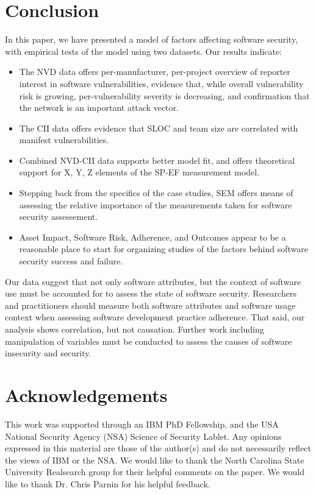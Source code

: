 \section{Conclusion}
\label{sec:conclusion}

In this paper, we have presented a model of factors affecting software security, with empirical tests of the model using two datasets. Our results indicate:
\begin{itemize}
	\item The NVD data offers per-manufacturer, per-project overview of reporter interest in software vulnerabilities, evidence that, while overall vulnerability risk is growing, per-vulnerability severity is decreasing, and confirmation that the network is an important attack vector.
	\item The CII data offers evidence that SLOC and team size are correlated with manifest vulnerabilities. 
	\item Combined NVD-CII data supports better model fit, and offers theoretical support for X, Y, Z elements of the SP-EF measurement model. 
	\item Stepping back from the specifics of the case studies, SEM offers means of assessing the relative importance of the measurements taken for software security assessement.
	\item Asset Impact, Software Risk, Adherence, and Outcomes appear to be a reasonable place to start for organizing studies of the factors behind software security success and failure. 
\end{itemize}

Our data suggest that not only software attributes, but the context of software use must be accounted for to assess the state of software security. Researchers and practitioners should measure both software attributes and software usage context when assessing software development practice adherence. That said, our analysis shows correlation, but not causation. Further work including manipulation of variables must be conducted to assess the causes of software insecurity and security. 

\section{Acknowledgements}

This work was supported through an IBM PhD Fellowship, and the USA National Security Agency (NSA) Science of Security Lablet. Any opinions expressed in this material are those of the author(s) and do not necessarily reflect the views of IBM or the NSA. We would like to thank the North Carolina State University Realsearch group for their helpful comments on the paper. We would like to thank Dr. Chris Parnin for his helpful feedback.